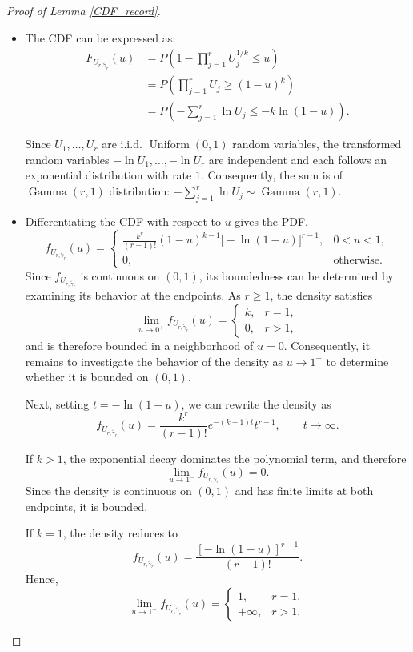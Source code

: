 \documentclass[authoryear,preprint,3p,review,10pt]{elsarticle}
\theoremstyle{definition}
\begin{document}
	\begin{proof}[Proof of Lemma \ref{CDF_record}]
		\begin{itemize}
			\item The CDF can be expressed as:
			\[
			\begin{aligned}
				F_{U_{r,\tilde{\gamma}_r}}(u)
				&=P\left(1-\prod_{j=1}^{r}U_j^{1/k}\le u\right)\\
				&=P\left(\prod_{j=1}^{r}U_j\ge(1-u)^k\right)\\
				&=P\left(-\sum_{j=1}^{r}\ln U_j
				\le -k\ln(1-u)\right).
			\end{aligned}
			\]
			
			Since \(U_1,\ldots,U_r\) are i.i.d. \(\operatorname{Uniform}(0,1)\) random variables, the transformed random variables \(-\ln U_1,\ldots,-\ln U_r\) are independent and each follows an exponential distribution with rate \(1\). Consequently, the sum is of $\operatorname{Gamma}(r,1)$ distribution: $-\sum_{j=1}^{r}\ln U_j
			\sim \operatorname{Gamma}(r,1).$ 
			
			
			\item Differentiating the CDF with respect to \(u\) gives the PDF.
			\[
			f_{U_{r,\tilde{\gamma}_r}}(u)=
			\begin{cases}
				\displaystyle
				\frac{k^r}{(r-1)!}
				(1-u)^{k-1}
				\big[-\ln(1-u)\big]^{r-1},
				& 0<u<1,\\[10pt]
				0, & \text{otherwise}.
			\end{cases}
			\]
			Since \(f_{U_{r,\tilde{\gamma}_r}}\) is continuous on \((0,1)\), its boundedness can be determined by examining its behavior at the endpoints. As \(r\geq 1\), the density satisfies
			\[
			\lim_{u\to0^+}f_{U_{r,\tilde{\gamma}_r}}(u)
			=
			\begin{cases}
				k, & r=1,\\
				0, & r>1,
			\end{cases}
			\]
			and is therefore bounded in a neighborhood of \(u=0\). Consequently, it remains to investigate the behavior of the density as \(u\to1^-\) to determine whether it is bounded on \((0,1)\).
			
			
			Next, setting \(t=-\ln(1-u)\), we can rewrite the density as
			\[
			f_{U_{r,\tilde{\gamma}_r}}(u)
			=
			\frac{k^r}{(r-1)!}
			e^{-(k-1)t}t^{r-1},
			\qquad t\to\infty.
			\]
			
			If \(k>1\), the exponential decay dominates the polynomial term, and therefore
			\[
			\lim_{u\to1^-}f_{U_{r,\tilde{\gamma}_r}}(u)=0.
			\]
			Since the density is continuous on \((0,1)\) and has finite limits at both endpoints, it is bounded.
			
			If \(k=1\), the density reduces to
			\[
			f_{U_{r,\tilde{\gamma}_r}}(u)
			=
			\frac{[-\ln(1-u)]^{r-1}}{(r-1)!}.
			\]
			Hence,
			\[
			\lim_{u\to1^-}f_{U_{r,\tilde{\gamma}_r}}(u)
			=
			\begin{cases}
				1, & r=1,\\
				+\infty, & r>1.
			\end{cases}
			\]
		\end{itemize}
	\end{proof}
\end{document}
